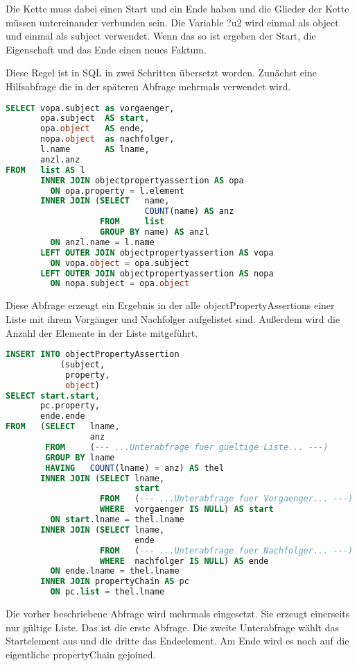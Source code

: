 Die Kette muss dabei einen Start und ein Ende haben und die Glieder der Kette müssen untereinander verbunden sein. Die Variable ?u2 wird einmal als object und einmal als subject verwendet. Wenn das so ist ergeben der Start, die Eigenschaft und das Ende einen neues Faktum.

Diese Regel ist in SQL in zwei Schritten übersetzt worden. Zunächst eine Hilfsabfrage die in der späteren Abfrage mehrmals verwendet wird.

\begin{lstlisting}[language=SQL]
SELECT vopa.subject as vorgaenger,
       opa.subject  AS start,
       opa.object   AS ende,
       nopa.object  as nachfolger,
       l.name       AS lname,
       anzl.anz
FROM   list AS l
       INNER JOIN objectpropertyassertion AS opa
         ON opa.property = l.element
       INNER JOIN (SELECT   name,
                            COUNT(name) AS anz
                   FROM     list
                   GROUP BY name) AS anzl
         ON anzl.name = l.name
       LEFT OUTER JOIN objectpropertyassertion AS vopa
         ON vopa.object = opa.subject
       LEFT OUTER JOIN objectpropertyassertion AS nopa
         ON nopa.subject = opa.object
\end{lstlisting}

Diese Abfrage erzeugt ein Ergebnis in der alle objectPropertyAssertions einer Liste mit ihrem Vorgänger und Nachfolger aufgelistet sind. Außerdem wird die Anzahl der Elemente in der Liste mitgeführt.

\begin{lstlisting}[language=SQL]
INSERT INTO objectPropertyAssertion
           (subject,
            property,
            object)
SELECT start.start,
       pc.property,
       ende.ende
FROM   (SELECT   lname,
                 anz
        FROM     (--- ...Unterabfrage fuer gueltige Liste... ---)
        GROUP BY lname
        HAVING   COUNT(lname) = anz) AS thel
       INNER JOIN (SELECT lname,
                          start
                   FROM   (--- ...Unterabfrage fuer Vorgaenger... ---)
                   WHERE  vorgaenger IS NULL) AS start
         ON start.lname = thel.lname
       INNER JOIN (SELECT lname,
                          ende
                   FROM   (--- ...Unterabfrage fuer Nachfolger... ---)
                   WHERE  nachfolger IS NULL) AS ende
         ON ende.lname = thel.lname
       INNER JOIN propertyChain AS pc
         ON pc.list = thel.lname
\end{lstlisting}

Die vorher beschriebene Abfrage wird mehrmals eingesetzt. Sie erzeugt einerseits nur gültige Liste. Das ist die erste Abfrage. Die zweite Unterabfrage wählt das Startelement aus und die dritte das Endeelement. Am Ende wird es noch auf die eigentliche propertyChain gejoined.

